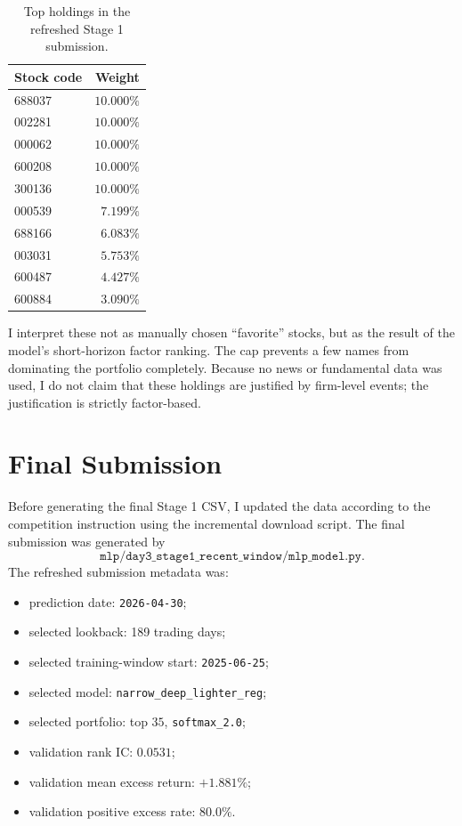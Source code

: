\documentclass[11pt]{article}
\begin{document}
\begin{table}[h]
\centering
\caption{Top holdings in the refreshed Stage 1 submission.}
\begin{tabular}{lr}
\toprule
Stock code & Weight \\
\midrule
688037 & \(10.000\%\) \\
002281 & \(10.000\%\) \\
000062 & \(10.000\%\) \\
600208 & \(10.000\%\) \\
300136 & \(10.000\%\) \\
000539 & \(7.199\%\) \\
688166 & \(6.083\%\) \\
003031 & \(5.753\%\) \\
600487 & \(4.427\%\) \\
600884 & \(3.090\%\) \\
\bottomrule
\end{tabular}
\end{table}

I interpret these not as manually chosen ``favorite'' stocks, but as the
result of the model's short-horizon factor ranking. The cap prevents a few
names from dominating the portfolio completely. Because no news or fundamental
data was used, I do not claim that these holdings are justified by firm-level
events; the justification is strictly factor-based.

\section{Final Submission}

Before generating the final Stage 1 CSV, I updated the data according to the
competition instruction using the incremental download script. The final
submission was generated by
\[
    \texttt{mlp/day3\_stage1\_recent\_window/mlp\_model.py}.
\]
The refreshed submission metadata was:

\begin{itemize}
    \item prediction date: \texttt{2026-04-30};
    \item selected lookback: 189 trading days;
    \item selected training-window start: \texttt{2025-06-25};
    \item selected model: \texttt{narrow\_deep\_lighter\_reg};
    \item selected portfolio: top \(35\), \texttt{softmax\_2.0};
    \item validation rank IC: \(0.0531\);
    \item validation mean excess return: \(+1.881\%\);
    \item validation positive excess rate: \(80.0\%\).
\end{itemize}
\end{document}
